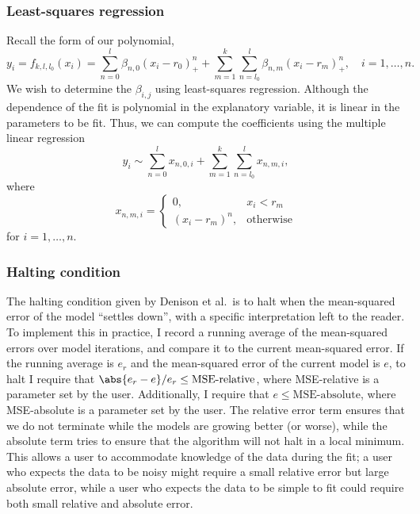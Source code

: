 \documentclass[12pt]{article}
\begin{document}
\subsubsection{Least-squares regression}

Recall the form of our polynomial,
\begin{equation*}
  y_i = f_{k, l, l_0}(x_i) = \sum_{n = 0}^l \beta_{n, 0} (x_i - r_0)^n_+ +
  \sum_{m = 1}^k \sum_{n = l_0}^l \beta_{n, m} (x_i - r_m)^n_+, \quad
  i = 1, \ldots, n.
\end{equation*}
We wish to determine the $\beta_{i, j}$ using least-squares
regression. Although the dependence of the fit is polynomial in the
explanatory variable, it is linear in the parameters to be fit. Thus,
we can compute the coefficients using the multiple linear regression
\begin{equation*}
  y_i \sim \sum_{n = 0}^l x_{n, 0, i} + \sum_{m = 1}^k \sum_{n = l_0}^l
  x_{n, m, i},
\end{equation*}
where
\begin{equation*}
  x_{n, m, i} = 
  \begin{cases}
    0, & x_i < r_m \\
    (x_i - r_m)^n, & \text{otherwise}
  \end{cases}
\end{equation*}
for $i = 1, \ldots, n$.

\subsubsection{Halting condition}

The halting condition given by Denison et al.\ is to halt when the
mean-squared error of the model ``settles down'', with a specific
interpretation left to the reader. To implement this in practice, I
record a running average of the mean-squared errors over model
iterations, and compare it to the current mean-squared error. If the
running average is $e_r$ and the mean-squared error of the current
model is $e$, to halt I require that $\abs{e_r - e} / e_r \le
\text{MSE-relative}$, where MSE-relative is a parameter set by the
user. Additionally, I require that $e \le \text{MSE-absolute}$, where
MSE-absolute is a parameter set by the user. The relative error term
ensures that we do not terminate while the models are growing better
(or worse), while the absolute term tries to ensure that the algorithm
will not halt in a local minimum. This allows a user to accommodate
knowledge of the data during the fit; a user who expects the data to
be noisy might require a small relative error but large absolute
error, while a user who expects the data to be simple to fit could
require both small relative and absolute error.
\end{document}
